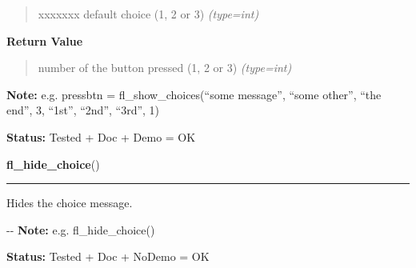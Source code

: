 \begin{boxedminipage}{\funcwidth}
\begin{quote}
\begin{Ventry}{xxxxxxx}
default choice (1, 2 or 3)
            {\it (type=int)}

        \end{Ventry}

      \end{quote}

      \textbf{Return Value}
    \vspace{-1ex}

      \begin{quote}

number of the button pressed (1, 2 or 3)
      {\it (type=int)}

      \end{quote}

\textbf{Note:} 
e.g. pressbtn = fl\_show\_choices(``some message'', ``some other'',
``the end'', 3, ``1st'', ``2nd'', ``3rd'', 1)


\textbf{Status:} 
Tested + Doc + Demo = OK


    \end{boxedminipage}

    \label{xformslib:flgoodies:fl_hide_choice}

    \vspace{0.5ex}

\hspace{.8\funcindent}\begin{boxedminipage}{\funcwidth}

    \raggedright \textbf{fl\_hide\_choice}()

    \vspace{-1.5ex}

    \rule{\textwidth}{0.5\fboxrule}
\setlength{\parskip}{2ex}

Hides the choice message.

-{}-
\setlength{\parskip}{1ex}
\textbf{Note:} 
e.g. fl\_hide\_choice()


\textbf{Status:} 
Tested + Doc + NoDemo = OK


    \end{boxedminipage}

    \label{xformslib:flgoodies:fl_set_choices_shortcut}

    \vspace{0.5ex}

